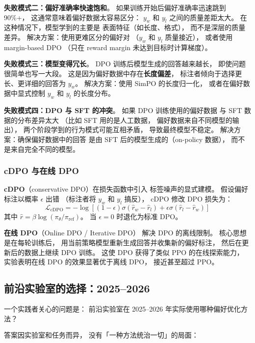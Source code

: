 \textbf{失败模式二：偏好准确率快速饱和}。
如果训练开始后偏好准确率迅速跳到 90\%+，
这通常意味着偏好数据太容易区分：
$y_w$ 和 $y_l$ 之间的质量差距太大。
在这种情况下，模型学到的主要是
表面特征（如长度、格式），
而不是深层的质量差异。
解决方案：使用更难区分的偏好对
（$y_w$ 和 $y_l$ 质量接近），
或者使用 margin-based DPO
（只在 reward margin 未达到目标时计算梯度）。

\textbf{失败模式三：模型变得冗长}。
DPO 训练后模型生成的回答越来越长，
即使问题很简单也写一大段。
这是因为偏好数据中存在\textbf{长度偏差}，
标注者倾向于选择更长、更详细的回答为 $y_w$。
解决方案：使用 SimPO 的长度归一化，
或者在偏好数据中显式控制
$y_w$ 和 $y_l$ 的长度分布。

\textbf{失败模式四：DPO 与 SFT 的冲突}。
如果 DPO 训练使用的偏好数据
与 SFT 数据的分布差异太大
（比如 SFT 用的是人工数据，
偏好数据来自不同模型的输出），
两个阶段学到的行为模式可能互相矛盾，
导致最终模型不稳定。
解决方案：确保偏好数据中的回答
是由 SFT 后的模型生成的（on-policy 数据），
而不是来自完全不同的模型。

\subsubsection{cDPO 与在线 DPO}

\textbf{cDPO}（conservative DPO）在损失函数中引入
标签噪声的显式建模。
假设偏好标注以概率 $\epsilon$ 出错
（标注者将 $y_w$ 和 $y_l$ 搞反），
cDPO 修改 DPO 损失为：
\begin{equation}
  \mathcal{L}_{\text{cDPO}} = -\log\!\left[
    (1-\epsilon) \sigma(\hat{r}_w - \hat{r}_l)
    + \epsilon \sigma(\hat{r}_l - \hat{r}_w)
  \right]
\end{equation}
其中 $\hat{r} = \beta \log(\pi_\theta / \pi_{\text{ref}})$。
当 $\epsilon = 0$ 时退化为标准 DPO。

\textbf{在线 DPO}（Online DPO / Iterative DPO）
解决 DPO 的离线限制。
核心思想是在每轮训练后，
用当前策略模型重新生成回答并收集新的偏好标注，
然后在更新后的数据上继续 DPO 训练。
这使 DPO 获得了类似 PPO 的在线探索能力，
实验表明在线 DPO 的效果显著优于离线 DPO，
接近甚至超过 PPO。

\subsection{前沿实验室的选择：2025--2026}

一个实践者关心的问题是：
前沿实验室在 2025--2026 年实际使用哪种偏好优化方法？

答案因实验室和任务而异，
没有「一种方法统治一切」的局面：

